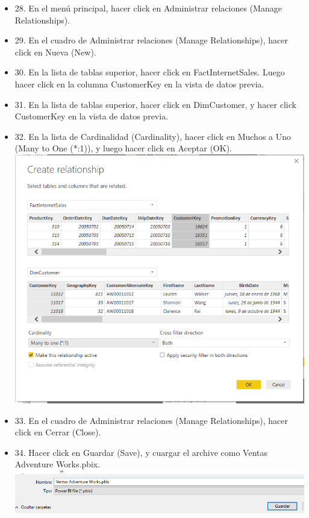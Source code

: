 \begin{itemize}
\item 28. En el menú principal, hacer click en Administrar relaciones (Manage Relationships).
\item 29. En el cuadro de Administrar relaciones (Manage Relationships), hacer click en Nueva (New).
\item 30. En la lista de tablas superior, hacer click en FactInternetSales. Luego hacer click en la columna CustomerKey en la vista de datos previa.
\item 31. En la lista de tablas superior, hacer click en DimCustomer, y hacer click CustomerKey en la vista de datos previa.
\item 32. En la lista de Cardinalidad (Cardinality), hacer click en Muchos a Uno (Many to One (*:1)), y luego hacer click en Aceptar (OK). \\
\includegraphics[scale=0.5]{./Imagenes/image010}
\item 33. En el cuadro de Administrar relaciones (Manage Relationships), hacer click en Cerrar (Close).
\item 34. Hacer click en Guardar (Save), y cuargar el archive como Ventas Adventure Works.pbix.\\
\includegraphics[scale=0.5]{./Imagenes/image011}


\end{itemize}
